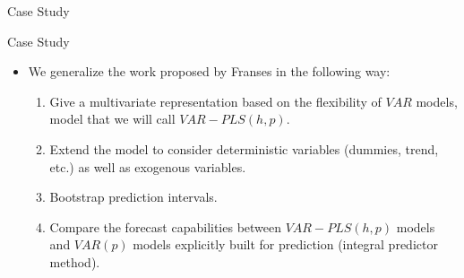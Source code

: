 \documentclass{beamer}
\newcommand{\?}{?`}
\begin{document}
\begin{frame}{Case Study}
  \begin{figure}[htbp]
\end{figure}
\end{frame}


\begin{frame}{Case Study}
  \begin{itemize}
    \item We generalize the work proposed by Franses in the following way:
    \bigskip

      \begin{enumerate}
      \item Give a multivariate representation based on the flexibility of $VAR$ models, model that we will call $VAR-PLS(h,p)$.
      \item Extend the model to consider deterministic variables (dummies, trend, etc.) as well as exogenous variables.
      \item Bootstrap prediction intervals.
      \item Compare the forecast capabilities between $VAR-PLS(h,p)$ models and $VAR(p)$ models explicitly built for prediction
      (integral predictor method).
            \end{enumerate}
  \end{itemize}
\end{frame}
\end{document}
